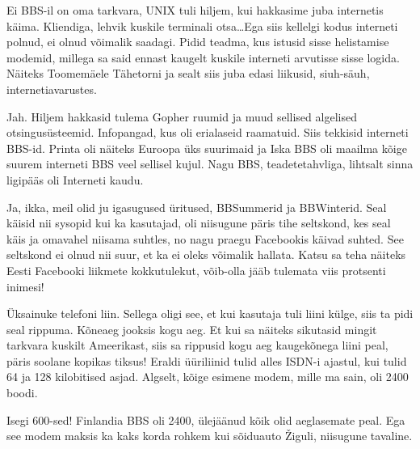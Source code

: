 
Ei BBS-il on oma tarkvara, UNIX tuli hiljem, kui hakkasime juba internetis käima. Kliendiga, lehvik kuskile terminali otsa\ldots Ega siis kellelgi kodus interneti polnud, ei olnud võimalik saadagi. Pidid teadma, kus istusid  sisse helistamise modemid, millega sa said ennast kaugelt kuskile interneti arvutisse sisse logida. Näiteks Toomemäele Tähetorni ja sealt siis juba edasi liikusid, siuh-säuh, internetiavarustes.
                 
                 
Jah. Hiljem hakkasid tulema Gopher ruumid ja muud sellised algelised otsingusüsteemid. Infopangad, kus oli erialaseid raamatuid. Siis tekkisid interneti BBS-id. Printa oli näiteks Euroopa üks suurimaid ja Iska BBS oli maailma kõige suurem interneti BBS veel sellisel kujul. Nagu BBS, teadetetahvliga, lihtsalt sinna ligipääs oli Interneti kaudu.


Ja, ikka, meil olid ju igasugused üritused, BBSummerid ja BBWinterid. Seal käisid nii sysopid kui ka  kasutajad, oli niisugune päris tihe seltskond, kes seal käis ja omavahel niisama suhtles, no nagu praegu Facebookis käivad suhted.  See seltskond ei olnud nii suur, et ka  ei oleks võimalik hallata. Katsu sa teha näiteks Eesti Facebooki liikmete kokkutulekut, võib-olla  jääb tulemata  viis protsenti inimesi!
        

Üksainuke telefoni liin. Sellega oligi see, et kui kasutaja tuli  liini külge, siis ta pidi seal rippuma. Kõneaeg jooksis kogu aeg. Et kui sa näiteks sikutasid mingit tarkvara kuskilt Ameerikast, siis sa rippusid kogu aeg kaugekõnega liini peal, päris soolane kopikas tiksus! Eraldi üüriliinid tulid alles ISDN-i ajastul, kui tulid 64 ja 128 kilobitised asjad. Algselt, kõige esimene modem, mille ma sain, oli 2400 boodi.
                 

Isegi 600-sed! Finlandia  BBS oli 2400,  ülejäänud kõik olid aeglasemate peal. Ega see modem maksis ka kaks korda rohkem kui sõiduauto Žiguli, niisugune tavaline.

